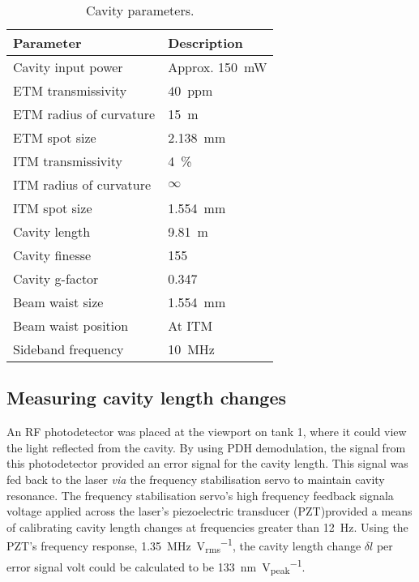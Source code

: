\begin{table}
  \centering
  \begin{tabular}{|l|l|}
    \hline
    \textbf{Parameter}        & \textbf{Description}	      \\ \hline
    Cavity input power      & Approx. \SI{150}{\milli\watt}   \\ \hline
    \gls{ETM} transmissivity      & $40$~ppm                  \\ \hline
    \gls{ETM} radius of curvature & \SI{15}{\meter}           \\ \hline
    \gls{ETM} spot size           & \SI{2.138}{\milli \meter} \\ \hline
    \gls{ITM} transmissivity      & \SI{4}{\%}                \\ \hline
    \gls{ITM} radius of curvature & $\infty$                  \\ \hline
    \gls{ITM} spot size           & \SI{1.554}{\milli \meter} \\ \hline
    Cavity length           & \SI{9.81}{\meter}               \\ \hline
    Cavity finesse          & \SI{155}{}                      \\ \hline
    Cavity g-factor         & \SI{0.347}{}                    \\ \hline
    Beam waist size         & \SI{1.554}{\milli \meter}       \\ \hline
    Beam waist position     & At \gls{ITM}                    \\ \hline
    Sideband frequency      & \SI{10}{\mega\hertz}            \\ \hline
  \end{tabular}
  \caption{\label{tab:cavity-parameters}Cavity parameters.}
\end{table}

\subsection{Measuring cavity length changes}

An RF photodetector was placed at the viewport on tank 1, where it could view the light reflected from the cavity. By using PDH demodulation, the signal from this photodetector provided an error signal for the cavity length. This signal was fed back to the laser \emph{via} the frequency stabilisation servo to maintain cavity resonance. The frequency stabilisation servo's high frequency feedback signal\textemdash a voltage applied across the laser's piezoelectric transducer (PZT)\textemdash provided a means of calibrating cavity length changes at frequencies greater than \SI{12}{\hertz}. Using the PZT's frequency response, \SI{1.35}{\mega\hertz \per \volt_{rms}}, the cavity length change $\delta l$ per error signal volt could be calculated to be \SI{133}{\nano\meter \per \volt_{peak}}.

